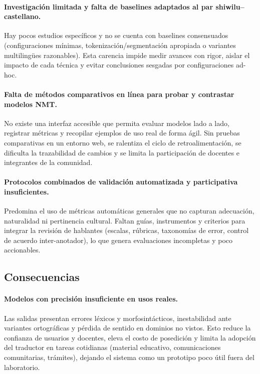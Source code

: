 \documentclass[12pt,a4paper,oneside]{book}
\begin{document}
\paragraph{Investigación limitada y falta de baselines adaptados al par shiwilu--castellano.}
Hay pocos estudios específicos y no se cuenta con baselines consensuados (configuraciones mínimas, tokenización/segmentación apropiada o variantes multilingües razonables). Esta carencia impide medir avances con rigor, aislar el impacto de cada técnica y evitar conclusiones sesgadas por configuraciones ad-hoc.

\paragraph{Falta de métodos comparativos en línea para probar y contrastar modelos NMT.}
No existe una interfaz accesible que permita evaluar modelos lado a lado, registrar métricas y recopilar ejemplos de uso real de forma ágil. Sin pruebas comparativas en un entorno web, se ralentiza el ciclo de retroalimentación, se dificulta la trazabilidad de cambios y se limita la participación de docentes e integrantes de la comunidad.

\paragraph{Protocolos combinados de validación automatizada y participativa insuficientes.}
Predomina el uso de métricas automáticas generales que no capturan adecuación, naturalidad ni pertinencia cultural. Faltan guías, instrumentos y criterios para integrar la revisión de hablantes (escalas, rúbricas, taxonomías de error, control de acuerdo inter-anotador), lo que genera evaluaciones incompletas y poco accionables.

\subsection{Consecuencias}\label{consecuencias}

\paragraph{Modelos con precisión insuficiente en usos reales.}
Las salidas presentan errores léxicos y morfosintácticos, inestabilidad ante variantes ortográficas y pérdida de sentido en dominios no vistos. Esto reduce la confianza de usuarios y docentes, eleva el costo de posedición y limita la adopción del traductor en tareas cotidianas (material educativo, comunicaciones comunitarias, trámites), dejando el sistema como un prototipo poco útil fuera del laboratorio.
\end{document}
